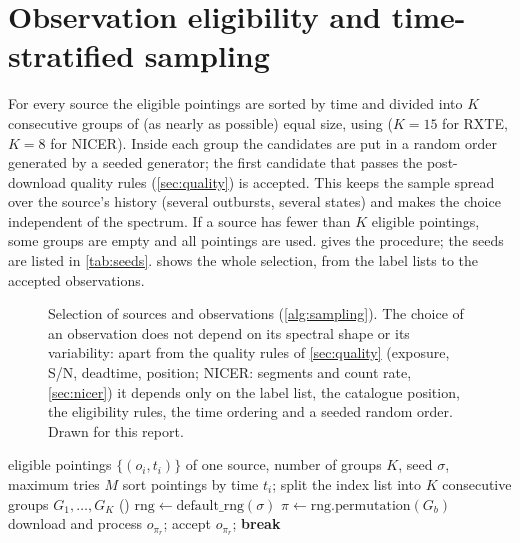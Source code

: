 \section{Observation eligibility and time-stratified sampling}\label{sec:sampling}

For every source the eligible pointings are sorted by time and divided into $K$ consecutive groups of (as nearly as
possible) equal size, using  ($K=15$ for RXTE, $K=8$ for NICER). Inside each group the
candidates are put in a random order generated by a seeded generator; the first candidate that passes the post-download
quality rules (\cref{sec:quality}) is accepted. This keeps the sample spread over the source's history (several
outbursts, several states) and makes the choice independent of the spectrum. If a source has fewer than $K$ eligible
pointings, some groups are empty and all pointings are used.  gives the procedure; the seeds are
listed in \cref{tab:seeds}.  shows the whole selection, from the label lists to the accepted
observations.

\begin{figure}[htbp]
\centering

\caption[Selection of sources and observations]{Selection of sources and observations (\cref{alg:sampling}). The choice of an
observation does not depend on its spectral shape or its variability: apart from the quality rules of \cref{sec:quality}
(exposure, S/N, deadtime, position; NICER: segments and count rate, \cref{sec:nicer}) it depends only on the label list, the
catalogue position, the eligibility rules, the time ordering and a seeded random order. Drawn for this report.}
\label{fig:selectflow}
\end{figure}

\begin{algorithm}[htbp]
\caption{Time-stratified candidate ranking and acceptance ( + ;
NICER: , , )}\label{alg:sampling}
\begin{algorithmic}[1]
\Require eligible pointings $\{(o_i, t_i)\}$ of one source, number of groups $K$, seed $\sigma$, maximum tries $M$
\State sort pointings by time $t_i$; split the index list into $K$ consecutive groups $G_1,\dots,G_K$ ()
\State $\mathrm{rng} \gets \mathrm{default\_rng}(\sigma)$
  \State $\pi \gets \mathrm{rng.permutation}(G_b)$ 
     \State download and process $o_{\pi_r}$;  accept $o_{\pi_r}$; \textbf{break} \EndIf
  \EndFor
\EndFor
\end{algorithmic}
\end{algorithm}

